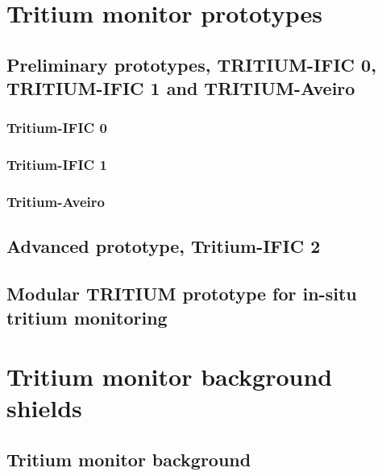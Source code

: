 \documentclass[12pt,a4paper]{book}
\begin{document}
\chapter{Tritium monitor prototypes}\label{chap:Prototypes}		
	\section[Preliminary prototypes]{Preliminary prototypes, TRITIUM-IFIC 0, TRITIUM-IFIC 1 and TRITIUM-Aveiro}\label{Preliminary_prototypes}
		\subsection{Tritium-IFIC 0}
		
		\subsection{Tritium-IFIC 1}
		
		\subsection{Tritium-Aveiro}
		\newpage
		
	\section[Tritium-IFIC 2]{Advanced prototype, Tritium-IFIC 2}
	\newpage
		
	\section[Modular TRITIUM prototype]{Modular TRITIUM prototype for in-situ tritium monitoring}
	\newpage
		
\chapter[Background shields]{Tritium monitor background shields}\label{chap:Shields}
	\section{Tritium monitor background}
	\newpage
		
\end{document}
